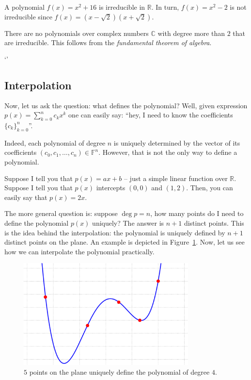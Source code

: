 \documentclass[../lecture-notes-148x210.tex]{subfiles}
\begin{document}
\begin{example}
    A polynomial $f(x) = x^2+16$ is irreducible in $\mathbb{R}$. In turn, $f(x) = x^2-2$ is not irreducible since $f(x) = (x-\sqrt{2})(x+\sqrt{2})$. 
\end{example}

\begin{example}
    There are no polynomials over complex numbers $\mathbb{C}$ with degree more than $2$ that are irreducible. This follows from the \textit{fundamental theorem of algebra}.
\end{example}
`'

\subsection{Interpolation}

Now, let us ask the question: what defines the polynomial? Well, given expression $p(x) = \sum_{k=0}^n c_kx^k$ one can easily say: ``hey, I need to know the coefficients $\{c_k\}_{k=0}^n$''.

Indeed, each polynomial of degree $n$ is uniquely determined by the vector of its coefficients $(c_0,c_1,\dots,c_n) \in \mathbb{F}^n$. However, that is not the only way to define a polynomial.

Suppose I tell you that $p(x) = ax + b$ -- just a simple linear function over $\mathbb{R}$. Suppose I tell you that $p(x)$ intercepts $(0,0)$ and $(1,2)$. Then, you can easily say that $p(x) = 2x$. 

The more general question is: suppose $\deg p = n$, how many points do I need to define the polynomial $p(x)$ uniquely? The answer is $n+1$ distinct points. This is the idea behind the interpolation:
the polynomial is uniquely defined by $n+1$ distinct points on the plane. An example is depicted 
in Figure~\ref{fig:interpolation}. Now, let us see how we can interpolate the polynomial practically.

\begin{figure}[H]
    \centering
    \includegraphics[width=0.8\textwidth]{images/lecture_1/interpolation.pdf}
    \caption{$5$ points on the plane uniquely define the polynomial of degree $4$.}
    \label{fig:interpolation}
\end{figure}
\end{document}

